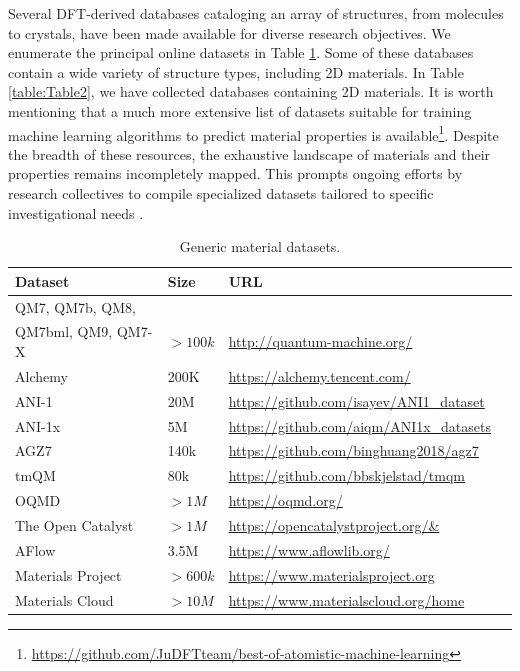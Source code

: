 Several DFT-derived databases cataloging an array of structures, from molecules to crystals, have been made available for diverse research objectives. We enumerate the principal online datasets in Table \ref{table:Table1}. Some of these databases contain a wide variety of structure types, including 2D materials. In Table \ref{table:Table2}, we have collected databases containing 2D materials. It is worth mentioning that a much more extensive list of datasets suitable for training machine learning algorithms to predict material properties is available\footnote{ \url{https://github.com/JuDFTteam/best-of-atomistic-machine-learning}}. Despite the breadth of these resources, the exhaustive landscape of materials and their properties remains incompletely mapped. This prompts ongoing efforts by research collectives to compile specialized datasets tailored to specific investigational needs \cite{lu2024machine}.

\begin{table}[ht]
    
    \centering
    \begin{tabular}{l l l l}
        \toprule
        \hline
        Dataset      & Size   & URL   \\
        \hline
        QM7, QM7b, QM8, &&& \\
        QM7bml, QM9, QM7-X & $ >100k$ & \url{http://quantum-machine.org/}  \\
        Alchemy &  200K & \url{https://alchemy.tencent.com/}  \\
        ANI-1 & 20M &  \url{https://github.com/isayev/ANI1_dataset} \\
        ANI-1x & 5M &  \url{https://github.com/aiqm/ANI1x_datasets} \\
        AGZ7 & 140k & \url{https://github.com/binghuang2018/agz7} \\
        tmQM & 80k & \url{https://github.com/bbskjelstad/tmqm} \\
        OQMD & $>1M$ & \url{https://oqmd.org/} \\
        The Open Catalyst & $>1M$ & \url{https://opencatalystproject.org/&} \\
        AFlow & 3.5M & \url{https://www.aflowlib.org/} \\
        Materials Project & $>600k$ & \url{https://www.materialsproject.org} \\
        Materials Cloud & $>10M$ & \url{https://www.materialscloud.org/home} \\
        \bottomrule
        
    \end{tabular}
    \caption{Generic material datasets.}
    \label{table:Table1}
\end{table}

